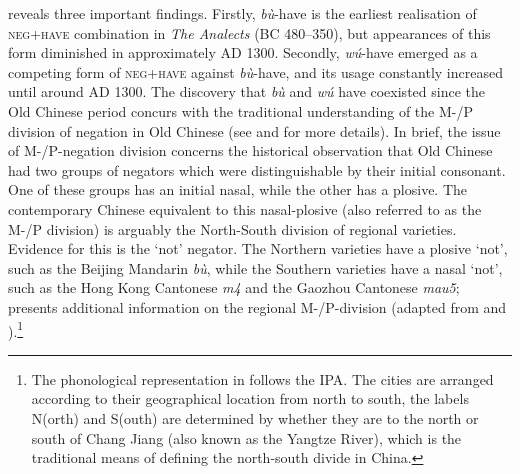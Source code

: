 \documentclass[output=paper,colorlinks,citecolor=brown,chinesefont]{langscibook}
\begin{document}
 reveals three important findings. Firstly, \textit{bù}-have is the earliest realisation of \textsc{neg}+\textsc{have} combination in \emph{The Analects} (BC 480–350), but appearances of this form diminished in approximately AD 1300. Secondly, \textit{wú}-have emerged as a competing form of \textsc{neg}+\textsc{have} against \textit{bù}-have, and its usage constantly increased until around AD 1300. The discovery that \textit{bù} and \textit{wú} have coexisted since the Old Chinese period concurs with the traditional understanding of the M-/P division of negation in Old Chinese (see \citealt{Hashimoto1985} and \citealt{Zhang2002} for more details). In brief, the issue of M-/P-negation division concerns the historical observation that Old Chinese had two groups of negators which were distinguishable by their initial consonant. One of these groups has an initial nasal, while the other has a plosive. The contemporary Chinese equivalent to this nasal-plosive (also referred to as the M-/P division) is arguably the North-South division of regional varieties. Evidence for this is the `not' negator. The Northern varieties have a plosive `not', such as the Beijing Mandarin \textit{bù}, while the Southern varieties have a nasal `not', such as the Hong Kong Cantonese \textit{m4} and the Gaozhou Cantonese \textit{mau5};  presents additional information on the regional M-/P-division (adapted from \citealt{Hashimoto1985} and \citealt{Zhang2002}).\footnote{The phonological representation in  follows the IPA. The cities are arranged according to their geographical location from north to south, the labels N(orth) and S(outh) are determined by whether they are to the north or south of Chang Jiang (also known as the Yangtze River), which is the traditional means of defining the north-south divide in China.}
\end{document}
